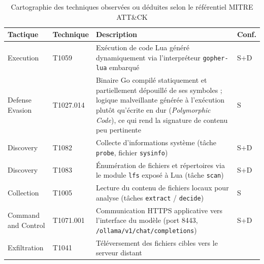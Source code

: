 \begin{table}[htbp]
  \centering
  \small
  \setlength{\parindent}{0pt}
  \setlength{\tabcolsep}{5pt}
  \renewcommand{\arraystretch}{1.25}
  \caption{Cartographie des techniques observées ou déduites selon le référentiel
           MITRE ATT\&CK}
  \label{tab:attack}
  \begin{tabularx}{\linewidth}{@{}
      >{\RaggedRight\arraybackslash}p{2.7cm}
      >{\ttfamily\RaggedRight\arraybackslash}p{1.9cm}
      >{\RaggedRight\arraybackslash}X
      >{\centering\arraybackslash}p{1.1cm} @{}}
    \toprule
    \textbf{Tactique} & \normalfont\bfseries Technique & \textbf{Description} & \textbf{Conf.} \\
    \midrule
    Execution
      & T1059
      & Exécution de code Lua généré dynamiquement via l'interpréteur
        \texttt{gopher-lua} embarqué
      & S+D \\
    \addlinespace
    Defense Evasion
      & T1027.014
      & Binaire Go compilé statiquement et partiellement dépouillé de ses
        symboles ; logique malveillante générée à l'exécution plutôt qu'écrite
        en dur (\emph{Polymorphic Code}), ce qui rend la signature de contenu
        peu pertinente
      & S \\
    \addlinespace
    Discovery
      & T1082
      & Collecte d'informations système (tâche \texttt{probe}, fichier
        \texttt{sysinfo})
      & S+D \\
    Discovery
      & T1083
      & Énumération de fichiers et répertoires via le module \texttt{lfs}
        exposé à Lua (tâche \texttt{scan})
      & S+D \\
    \addlinespace
    Collection
      & T1005
      & Lecture du contenu de fichiers locaux pour analyse
        (tâches \texttt{extract} / \texttt{decide})
      & S \\
    \addlinespace
    Command and Control
      & T1071.001
      & Communication HTTPS applicative vers l'interface du modèle
        (port 8443, \texttt{/ollama/v1/chat/completions})
      & S+D \\
    \addlinespace
    Exfiltration
      & T1041
      & Téléversement des fichiers cibles vers le serveur distant

\end{tabularx}
\end{table}
